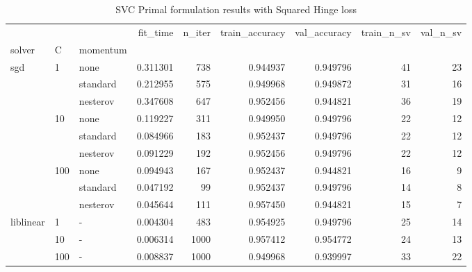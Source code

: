 \begin{table}[H]
\centering
\caption{SVC Primal formulation results with Squared Hinge loss}
\label{primal_svc_squared_hinge_cv_results}
\begin{tabular}{lllrrrrrr}
\toprule
          &     &   &  fit\_time &  n\_iter &  train\_accuracy &  val\_accuracy &  train\_n\_sv &  val\_n\_sv \\
solver & C & momentum &           &         &                 &               &             &           \\
\midrule
sgd & 1   & none &  0.311301 &     738 &        0.944937 &      0.949796 &          41 &        23 \\
          &     & standard &  0.212955 &     575 &        0.949968 &      0.949872 &          31 &        16 \\
          &     & nesterov &  0.347608 &     647 &        0.952456 &      0.944821 &          36 &        19 \\
          & 10  & none &  0.119227 &     311 &        0.949950 &      0.949796 &          22 &        12 \\
          &     & standard &  0.084966 &     183 &        0.952437 &      0.949796 &          22 &        12 \\
          &     & nesterov &  0.091229 &     192 &        0.952456 &      0.949796 &          22 &        12 \\
          & 100 & none &  0.094943 &     167 &        0.952437 &      0.944821 &          16 &         9 \\
          &     & standard &  0.047192 &      99 &        0.952437 &      0.949796 &          14 &         8 \\
          &     & nesterov &  0.045644 &     111 &        0.957450 &      0.944821 &          15 &         7 \\
liblinear & 1   & - &  0.004304 &     483 &        0.954925 &      0.949796 &          25 &        14 \\
          & 10  & - &  0.006314 &    1000 &        0.957412 &      0.954772 &          24 &        13 \\
          & 100 & - &  0.008837 &    1000 &        0.949968 &      0.939997 &          33 &        22 \\
\bottomrule
\end{tabular}
\end{table}
